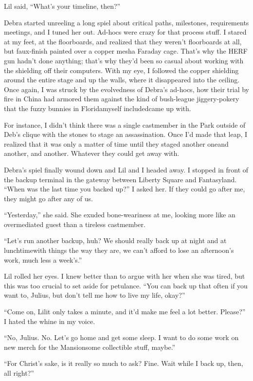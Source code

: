 Lil said, “What's your timeline, then?”

Debra started unreeling a long spiel about critical paths,
milestones, requirements meetings, and I tuned her out. Ad-hocs
were crazy for that process stuff. I stared at my feet, at the
floorboards, and realized that they weren't floorboards at all, but
faux-finish painted over a copper mesh{\dash}a Faraday cage. That's why
the HERF gun hadn't done anything; that's why they'd been so casual
about working with the shielding off their computers. With my eye,
I followed the copper shielding around the entire stage and up the
walls, where it disappeared into the ceiling. Once again, I was
struck by the evolvedness of Debra's ad-hocs, how their trial by
fire in China had armored them against the kind of bush-league
jiggery-pokery that the fuzzy bunnies in Florida{\dash}myself
included{\dash}came up with.

For instance, I didn't think there was a single castmember in the
Park outside of Deb's clique with the stones to stage an
assassination. Once I'd made that leap, I realized that it was only
a matter of time until they staged another one{\dash}and another, and
another. Whatever they could get away with.

Debra's spiel finally wound down and Lil and I headed away. I
stopped in front of the backup terminal in the gateway between
Liberty Square and Fantasyland. “When was the last time you backed
up?” I asked her. If they could go after me, they might go after
any of us.

“Yesterday,” she said. She exuded bone-weariness at me, looking
more like an overmediated guest than a tireless castmember.

“Let's run another backup, huh? We should really back up at night
and at lunchtime{\dash}with things the way they are, we can't afford to
lose an afternoon's work, much less a week's.”

Lil rolled her eyes. I knew better than to argue with her when she
was tired, but this was too crucial to set aside for petulance.
“You can back up that often if you want to, Julius, but don't tell
me how to live my life, okay?”

“Come on, Lil{\dash}it only takes a minute, and it'd make me feel a lot
better. Please?” I hated the whine in my voice.

“No, Julius. No. Let's go home and get some sleep. I want to do
some work on new merch for the Mansion{\dash}some collectible stuff,
maybe.”

“For Christ's sake, is it really so much to ask? Fine. Wait while I
back up, then, all right?”


